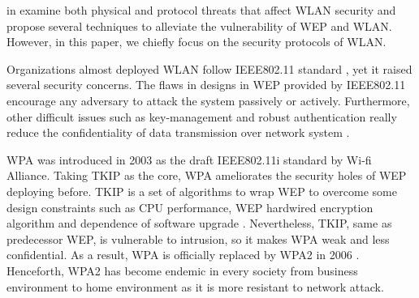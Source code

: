 \citeauthor{shunman2003wlan} in \cite{shunman2003wlan} examine both physical and protocol threats that affect \ac{WLAN} security and propose several techniques to alleviate the vulnerability of \ac{WEP} and \ac{WLAN}. However, in this paper, we chiefly focus on the security protocols of \ac{WLAN}.

Organizations almost deployed \ac{WLAN} follow \ac{IEEE}802.11 standard \cite{ieee1999802}, yet it raised several security concerns. The flaws in designs in \ac{WEP} provided by \ac{IEEE}802.11 encourage any adversary to attack the system passively or actively. Furthermore, other difficult issues such as key-management and robust authentication really reduce the confidentiality of data transmission over network system \cite{arbaugh2002your}.

\ac{WPA} was introduced in 2003 \cite{fitzpatrick_2016} as the draft \ac{IEEE}802.11i standard by Wi-fi Alliance. Taking \ac{TKIP} as the core, \ac{WPA} ameliorates the security holes of \ac{WEP} deploying before. \ac{TKIP} is a set of algorithms to wrap \ac{WEP} to overcome some design constraints such as \ac{CPU} performance, \ac{WEP} hardwired encryption algorithm and dependence of software upgrade \cite{doomun2012modified}. Nevertheless, \ac{TKIP}, same as predecessor \ac{WEP}, is vulnerable to intrusion, so it makes \ac{WPA} weak and less confidential. As a result, \ac{WPA} is officially replaced by \ac{WPA}2 in 2006 \cite{fitzpatrick_2016}. Henceforth, \ac{WPA}2 has become endemic in every society from business environment to home environment as it is more resistant to network attack.

